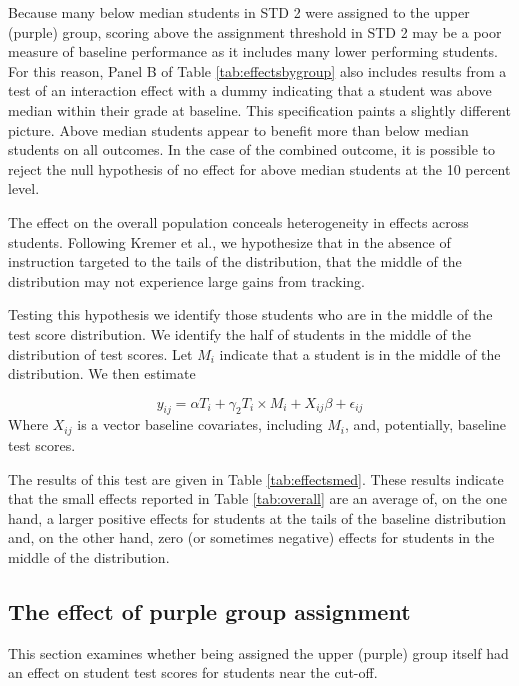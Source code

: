 \documentclass[10pt]{article}
\begin{document}
Because many below median students in STD 2 were assigned to the upper (purple) group, scoring above the assignment threshold in STD 2 may be a poor measure of baseline performance as it includes many lower performing students. For this reason, Panel B of Table \ref{tab:effectsbygroup} also includes results from a test of an interaction effect with a dummy indicating that a student was above median within their grade at baseline. This specification paints a slightly different picture. Above median students appear to benefit more than below median students on all outcomes. In the case of the combined outcome, it is possible to reject the null hypothesis of no effect for above median students at the 10 percent level.

The effect on the overall population conceals heterogeneity in effects across students. Following Kremer et al., we hypothesize that in the absence of instruction targeted to the tails of the distribution, that the middle of the distribution may not experience large gains from tracking. 

Testing this hypothesis we identify those students who are in the middle of the test score distribution. We identify the half of students in the middle of the distribution of test scores. Let $M_i$ indicate that a student is in the middle of the distribution. We then estimate

\[ y_{ij} = \alpha T_i + \gamma_2 T_i \times M_i + X_{ij} \beta + \epsilon_{ij} \]
Where $X_{ij}$ is a vector baseline covariates, including $M_i$, and, potentially, baseline test scores.

The results of this test are given in Table \ref{tab:effectsmed}. These results indicate that the small effects reported in Table \ref{tab:overall} are an average of, on the one hand, a larger positive effects for students at the tails of the baseline distribution and, on the other hand, zero (or sometimes negative) effects for students in the middle of the distribution.

\begin{landscape}

\end{landscape}

\subsection{The effect of purple group assignment}

This section examines whether being assigned the upper (purple) group itself had an effect on student test scores for students near the cut-off. 
\end{document}
